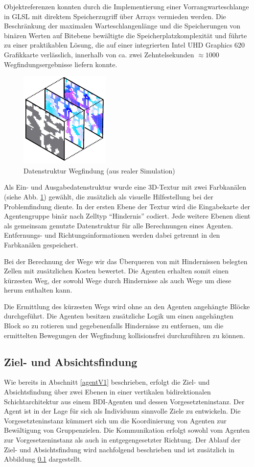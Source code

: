 \documentclass[runningheads]{llncs}
\begin{document}
Objektreferenzen konnten durch die Implementierung einer Vorrangwarteschlange in GLSL mit direktem Speicherzugriff über Arrays vermieden werden. Die Beschränkung der maximalen Warteschlangenlänge und die Speicherungen von binären Werten auf Bitebene bewältigte die Speicherplatzkomplexität und führte zu einer praktikablen Lösung, die auf einer integrierten Intel UHD Graphics 620 Grafikkarte verlässlich, innerhalb von ca. zwei Zehntelsekunden $ \approx 1000$ Wegfindungsergebnisse liefern konnte.

\begin{figure}
\includegraphics{./Referenzen/Pathfinding.pdf}
\caption{Datenstruktur Wegfindung (aus realer Simulation)}
\label{pathfinding}
\end{figure}
Als Ein- und Ausgabedatenstruktur wurde eine 3D-Textur mit zwei Farbkanälen (siehe Abb. \ref{pathfinding}) gewählt, die zusätzlich als visuelle Hilfestellung bei der Problemfindung diente. In der ersten Ebene der Textur wird die Eingabekarte der Agentengruppe binär nach Zelltyp "`Hindernis"' codiert. Jede weitere Ebenen dient als gemeinsam genutzte Datenstruktur für alle Berechnungen eines Agenten. Entfernungs- und Richtungsinformationen werden dabei getrennt in den Farbkanälen gespeichert.

Bei der Berechnung der Wege wir das Überqueren von mit Hindernissen belegten Zellen mit zusätzlichen Kosten bewertet. Die Agenten erhalten somit einen kürzesten Weg, der sowohl Wege durch Hindernisse als auch Wege um diese herum enthalten kann.

Die Ermittlung des kürzesten Wegs wird ohne an den Agenten angehängte Blöcke durchgeführt. Die Agenten besitzen zusätzliche Logik um einen angehängten Block so zu rotieren und gegebenenfalls Hindernisse zu entfernen, um die ermittelten Bewegungen der Wegfindung kollisionsfrei durchzuführen zu können.

\subsection{Ziel- und Absichtsfindung}\label{absichtsfindung}
Wie bereits in Abschnitt \ref{agentV1} beschrieben, erfolgt die Ziel- und Absichtsfindung über zwei Ebenen in einer vertikalen bidirektionalen Schichtarchitektur aus einem BDI-Agenten und dessen Vorgesetzteninstanz. Der Agent ist in der Lage für sich als Individuum sinnvolle Ziele zu entwickeln. Die Vorgesetzteninstanz kümmert sich um die Koordinierung von Agenten zur Bewältigung von Gruppenzielen. Die Kommunikation erfolgt sowohl vom Agenten zur Vorgesetzeninstanz als auch in entgegengesetzter Richtung. Der Ablauf der Ziel- und Absichtsfindung wird nachfolgend beschrieben und ist zusätzlich in Abbildung \ref{absichtsfindung} dargestellt.
\end{document}
